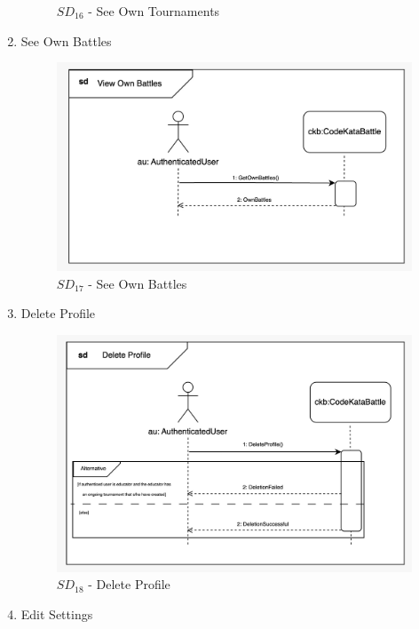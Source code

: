 \begin{enumerate}
\begin{figure}[H]
        \caption{$SD_{16}$ - See Own Tournaments}
    \end{figure}
    \newpage
    \item See Own Battles
    \begin{figure}[H]
        \centering
        \includegraphics[scale=0.2]{Images/sequence_diagrams/SD-view_own_battles.jpeg}
        \caption{$SD_{17}$ - See Own Battles}
    \end{figure}
    \item Delete Profile
    \begin{figure}[H]
        \centering
        \includegraphics[scale=0.2]{Images/sequence_diagrams/SD-delete_profile.jpeg}
        \caption{$SD_{18}$ - Delete Profile}
    \end{figure}
    \newpage
    \item Edit Settings
    \begin{figure}[H]
        \centering

\end{figure}
\end{enumerate}
